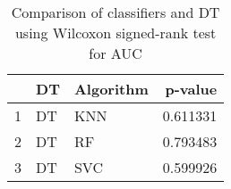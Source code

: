 \begin{table}
\footnotesize
\caption{Comparison of classifiers and DT using Wilcoxon signed-rank test for AUC}
\label{tab:DT wilcoxon AUC comparison}
\begin{tabular}{lllr}
\hline
 & DT & Algorithm & p-value \\
\hline
1 & DT & KNN & 0.611331 \\
2 & DT & RF & 0.793483 \\
3 & DT & SVC & 0.599926 \\
\hline
\end{tabular}
\end{table}
